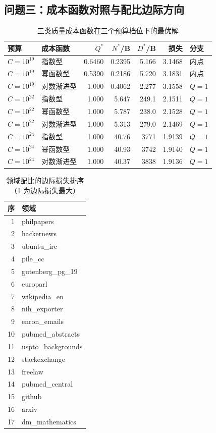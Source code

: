 \clearpage
\subsection{问题三：成本函数对照与配比边际方向}

\begin{table}[htbp]
  \centering
  \caption{三类质量成本函数在三个预算档位下的最优解}
  \label{tab:app-q3-costform}
  \small
  \begin{tabular}{@{}llrrrrl@{}}
    \toprule
    预算 & 成本函数 & $Q^{*}$ & $N^{*}$/B & $D^{*}$/B & 损失 & 分支 \\
    \midrule
    $C=10^{19}$ & 指数型 & 0.6460 & 0.2395 & 5.166 & 3.1468 & 内点 \\
    $C=10^{19}$ & 幂函数型 & 0.5390 & 0.2186 & 5.720 & 3.1831 & 内点 \\
    $C=10^{19}$ & 对数渐进型 & 1.000 & 0.4062 & 2.277 & 3.1558 & $Q=1$ \\
    $C=10^{22}$ & 指数型 & 1.000 & 5.647 & 249.1 & 2.1511 & $Q=1$ \\
    $C=10^{22}$ & 幂函数型 & 1.000 & 5.787 & 238.0 & 2.1528 & $Q=1$ \\
    $C=10^{22}$ & 对数渐进型 & 1.000 & 5.313 & 279.0 & 2.1469 & $Q=1$ \\
    $C=10^{24}$ & 指数型 & 1.000 & 40.76 & 3771 & 1.9139 & $Q=1$ \\
    $C=10^{24}$ & 幂函数型 & 1.000 & 40.93 & 3742 & 1.9140 & $Q=1$ \\
    $C=10^{24}$ & 对数渐进型 & 1.000 & 40.37 & 3838 & 1.9136 & $Q=1$ \\
    \bottomrule
  \end{tabular}
\end{table}

\begin{table}[htbp]
  \centering
  \caption{领域配比的边际损失排序（1 为边际损失最大）}
  \label{tab:app-q3-dldp}
  \small
  \begin{tabular}{@{}rl@{}}
    \toprule
    序 & 领域 \\
    \midrule
    1 & philpapers \\
    2 & hackernews \\
    3 & ubuntu\_irc \\
    4 & pile\_cc \\
    5 & gutenberg\_pg\_19 \\
    6 & europarl \\
    7 & wikipedia\_en \\
    8 & nih\_exporter \\
    9 & enron\_emails \\
    10 & pubmed\_abstracts \\
    11 & uspto\_backgrounds \\
    12 & stackexchange \\
    13 & freelaw \\
    14 & pubmed\_central \\
    15 & github \\
    16 & arxiv \\
    17 & dm\_mathematics \\
    \bottomrule
  \end{tabular}
\end{table}

